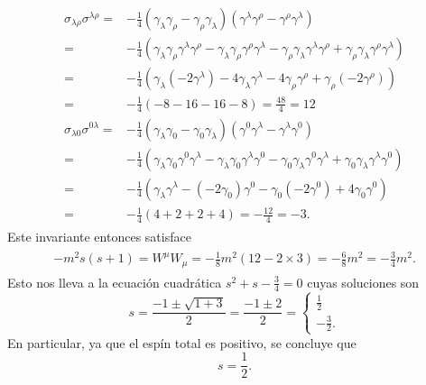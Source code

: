 \documentclass{article}
\begin{document}
\begin{enumerate}
\begin{align}
\begin{split}
\sigma_{\lambda\rho}\sigma^{\lambda\rho}=&-\frac{1}{4}(\gamma_\lambda\gamma_\rho-\gamma_\rho\gamma_\lambda)(\gamma^\lambda\gamma^\rho-\gamma^\rho\gamma^\lambda)\\
=&-\frac{1}{4}(\gamma_\lambda\gamma_\rho\gamma^\lambda\gamma^\rho-\gamma_\lambda\gamma_\rho\gamma^\rho\gamma^\lambda-\gamma_\rho\gamma_\lambda\gamma^\lambda\gamma^\rho+\gamma_\rho\gamma_\lambda\gamma^\rho\gamma^\lambda)\\
=&-\frac{1}{4}(\gamma_\lambda(-2\gamma^\lambda)-4\gamma_\lambda\gamma^\lambda-4\gamma_\rho\gamma^\rho+\gamma_\rho(-2\gamma^\rho))\\
=&-\frac{1}{4}(-8-16-16-8)=\frac{48}{4}=12\\
\sigma_{\lambda 0}\sigma^{0\lambda}=&-\frac{1}{4}(\gamma_\lambda\gamma_0-\gamma_0\gamma_\lambda)(\gamma^0\gamma^\lambda-\gamma^\lambda\gamma^0)\\
=&-\frac{1}{4}(\gamma_\lambda\gamma_0\gamma^0\gamma^\lambda-\gamma_\lambda\gamma_0\gamma^\lambda\gamma^0-\gamma_0\gamma_\lambda\gamma^0\gamma^\lambda+\gamma_0\gamma_\lambda\gamma^\lambda\gamma^0)\\
=&-\frac{1}{4}(\gamma_\lambda\gamma^\lambda-(-2\gamma_0)\gamma^0-\gamma_0(-2\gamma^0)+4\gamma_0\gamma^0)\\
=&-\frac{1}{4}(4+2+2+4)=-\frac{12}{4}=-3.
\end{split}
\end{align}
Este invariante entonces satisface
\begin{align}
\begin{split}
-m^2s(s+1)=W^\mu W_\mu=-\frac{1}{8}m^2(12-2\times3)=-\frac{6}{8}m^2=-\frac{3}{4}m^2.
\end{split}
\end{align}
Esto nos lleva a la ecuación cuadrática $s^2+s-\frac{3}{4}=0$ cuyas soluciones son
\begin{equation}
s=\frac{-1\pm\sqrt{1+3}}{2}=\frac{-1\pm 2}{2}=\begin{cases}
\frac{1}{2}\\
-\frac{3}{2}.
\end{cases}
\end{equation}
En particular, ya que el espín total es positivo, se concluye que
\begin{equation}
s=\frac{1}{2}.
\end{equation}

\end{enumerate}

%


\end{document}
